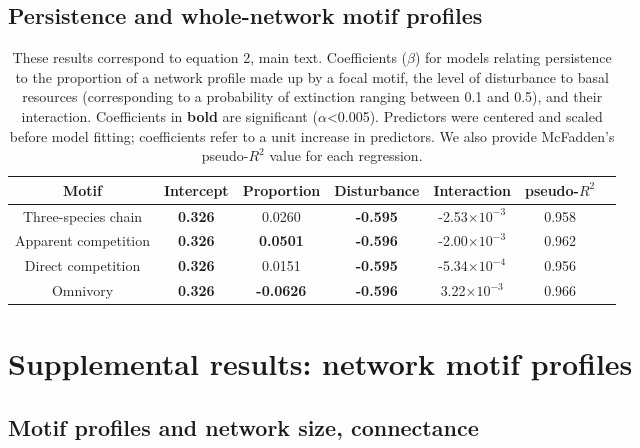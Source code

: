 \documentclass[12pt]{article}
\begin{document}
\begin{spacing}{2.0}
    \subsection{Persistence and whole-network motif profiles}


    \begin{table}[ht!]
        \caption{These results correspond to equation 2, main text. Coefficients ($\beta$) for models relating persistence to the proportion of a network profile made up by a focal motif, the level of disturbance to basal resources (corresponding to a probability of extinction ranging between 0.1 and 0.5), and their interaction. Coefficients in \textbf{bold} are significant ($\alpha$\textless0.005). Predictors were centered and scaled before model fitting; coefficients refer to a unit increase in predictors. We also provide McFadden's pseudo-$R^2$ value for each regression. }
        \label{motif_profile_tab}
        \centering
        \footnotesize
        \begin{tabular}{c|c c c c c | c }
        Motif & Intercept & Proportion & Disturbance & Interaction &  pseudo-$R^2$ \\
            \hline
            Three-species chain & \textbf{0.326} &  0.0260 & \textbf{-0.595} & -2.53$\times10^{-3}$ & 0.958 \\
            Apparent competition & \textbf{0.326} & \textbf{0.0501} & \textbf{-0.596} & -2.00$\times10^{-3}$ & 0.962 \\
            Direct competition & \textbf{0.326} & 0.0151 & \textbf{-0.595} & -5.34$\times10^{-4}$ & 0.956 \\
            Omnivory & \textbf{0.326} & \textbf{-0.0626} & \textbf{-0.596} & 3.22$\times10^{-3}$ & 0.966 \\
        \end{tabular}
    \end{table}


\clearpage

                

\section{Supplemental results: network motif profiles}


    \subsection{Motif profiles and network size, connectance}
    

\end{spacing}
\end{document}
